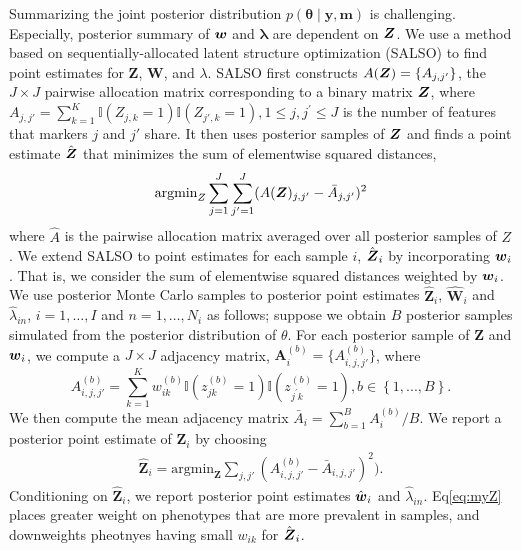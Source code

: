 \documentclass[12pt,]{article}
\newcommand{\bc}[1]{ \left\{#1\right\} }
\def\btheta{\bm{\theta}}
\def\y{\bm{y}}
\newcommand\m{\bm{m}}
\newcommand{\Ind}[1]{\mathbbm{1}\bc{#1}}
\def\Z{\bm{Z}}
\newcommand{\bZ}{\mbox{\boldmath $Z$}}
\newcommand{\bw}{\mbox{\boldmath $w$}}
\begin{document}
Summarizing the joint posterior distribution $p(\btheta \mid \y, \m)$ is
challenging.  Especially, posterior summary of $\bw$ and $\bm \lambda$ are dependent on $\bZ$. We use a method based on sequentially-allocated latent structure optimization
(SALSO) \citep{salso} to find point estimates for $\Z$, $\bm W$, and $\lambda$.  SALSO first constructs $A(\bZ)=\{A_{j,j'}\}$, the $J \times J$ pairwise allocation matrix corresponding to a binary matrix $\bZ$, where  $A_{j,j'} = \sum_{k=1}^K \mathbb{I}(Z_{j,k}=1)\mathbb{I}(Z_{j',k}=1), 1\leq j, j^\prime \leq J$ is the number of features that markers $j$ and $j'$ share. It then uses posterior samples of $\bZ$ and finds a point estimate $\hat{\bZ}$ that minimizes the sum of elementwise squared distances, 
\begin{eqnarray*}
\text{argmin}_Z\sum_{j=1}^J\sum_{j'=1}^J(A(\bZ)_{j,j'} - \bar{A}_{j,j'})^2
\label{eq:salso}
\end{eqnarray*}
%
where $\hat A$ is the pairwise allocation matrix averaged over all posterior
samples of $Z$.  %
%
We extend SALSO to point estimates for each sample $i$, $\hat{\bZ}_i$ by incorporating $\bw_i$. That is, we consider the sum of elementwise squared distances weighted by $\bw_i$.  We use posterior Monte Carlo samples to posterior point estimates $\hat{\Z}_i$, $\hat{\bm W}_i$ and $\hat{\lambda}_{in}$, $i=1, \ldots, I$ and $n=1, \ldots, N_i$ as follows; suppose we obtain \(B\) posterior samples simulated from the posterior
distribution of \(\theta\). For each posterior sample of \(\Z\) and \(\bw_i\), we compute a $J \times J$ adjacency matrix, \(\bm A_i^{(b)}
=\{A^{(b)}_{i,j,j'}\}\), where 
\[
A^{(b)}_{i,j,j'} = \sum_{k=1}^K w^{(b)}_{ik} 
\mathbb{I}\left( z^{(b)}_{jk} = 1\right)
\mathbb{I}\left(z^{(b)}_{j^\prime k} = 1\right), b \in \bc{1,...,B}.
\]
We then compute the mean adjacency matrix \(\bar A_i = \sum_{b=1}^B A_i^{(b)} /
B\).  We report a posterior point estimate of $\Z_i$ by choosing
\begin{eqnarray}
\hat{\bm Z}_i = \text{argmin}_{\bm Z} \sum_{j,j'} (A_{i,j,j'}^{(b)} - \bar A_{i,j,j'})^2).\label{eq:myZ}
\end{eqnarray}
Conditioning on $\hat{\Z}_i$, we report posterior point estimates $\hat{\bw}_i$ and $\hat{\lambda}_{in}$. %
Eq\eqref{eq:myZ} places greater weight on phenotypes that are more prevalent in samples, and downweights pheotnyes having small $w_{ik}$ for $\hat{\bZ}_i$.
\end{document}
